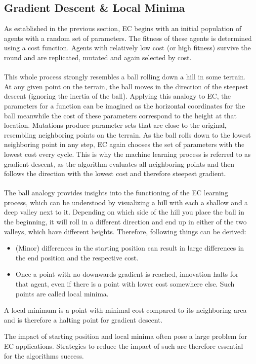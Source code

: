 \documentclass[11pt]{report}
\newcommand{\mydeflabel}{}
\newenvironment{mydef}[1]
{\renewcommand\mydeflabel{#1}\begin{mydefinner}}
{\end{mydefinner}}
\begin{document}
    \subsection{Gradient Descent \& Local Minima}\label{subsec:gradient-descent}
    As established in the previous section, EC begins with an initial population of agents with a random set of parameters.
    The fitness of these agents is determined using a cost function.
    Agents with relatively low cost (or high fitness) survive the round and are replicated, mutated and again selected by cost.
    \\ \\
    This whole process strongly resembles a ball rolling down a hill in some terrain.
    At any given point on the terrain, the ball moves in the direction of the steepest descent (ignoring the inertia of the ball).
    Applying this analogy to EC, the parameters for a function can be imagined as the horizontal coordinates for the ball meanwhile the cost of these parameters correspond to the height at that location.
    Mutations produce parameter sets that are close to the original, resembling neighboring points on the terrain.
    As the ball rolls down to the lowest neighboring point in any step, EC again chooses the set of parameters with the lowest cost every cycle.
    This is why the machine learning process is referred to as gradient descent, as the algorithm evaluates all neighboring points and then follows the direction with the lowest cost and therefore steepest gradient.
    \\ \\
    The ball analogy provides insights into the functioning of the EC learning process, which can be understood by visualizing a hill with each a shallow and a deep valley next to it.
    Depending on which side of the hill you place the ball in the beginning, it will roll in a different direction and end up in either of the two valleys, which have different heights.
    Therefore, following things can be derived:
    \begin{itemize}
        \item (Minor) differences in the starting position can result in large differences in the end position and the respective cost.
        \item Once a point with no downwards gradient is reached, innovation halts for that agent, even if there is a point with lower cost somewhere else.
        Such points are called local minima.
    \end{itemize}
    \begin{mydef}{Local Minimum}
        A local minimum is a point with minimal cost compared to its neighboring area and is therefore a halting point for gradient descent.
    \end{mydef}
    The impact of starting position and local minima often pose a large problem for EC applications.
    Strategies to reduce the impact of such are therefore essential for the algorithms success.
\end{document}
